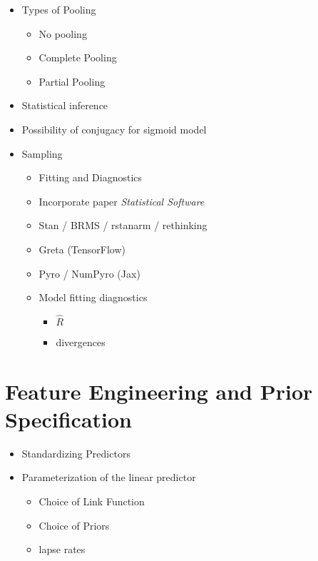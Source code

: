 \documentclass[
]{article}
\providecommand{\tightlist}{%
  \setlength{\itemsep}{0pt}\setlength{\parskip}{0pt}}
\begin{document}
\begin{itemize}
\tightlist
\item
  Types of Pooling

  \begin{itemize}
  \tightlist
  \item
    No pooling
  \item
    Complete Pooling
  \item
    Partial Pooling
  \end{itemize}
\item
  Statistical inference
\item
  Possibility of conjugacy for sigmoid model
\item
  Sampling

  \begin{itemize}
  \tightlist
  \item
    Fitting and Diagnostics
  \item
    Incorporate paper \emph{Statistical Software}
  \item
    Stan / BRMS / rstanarm / rethinking
  \item
    Greta (TensorFlow)
  \item
    Pyro / NumPyro (Jax)
  \item
    Model fitting diagnostics

    \begin{itemize}
    \tightlist
    \item
      \(\hat{R}\)
    \item
      divergences
    \end{itemize}
  \end{itemize}
\end{itemize}

\hypertarget{ch6}{%
\section{Feature Engineering and Prior Specification}\label{ch6}}

\begin{itemize}
\tightlist
\item
  Standardizing Predictors
\item
  Parameterization of the linear predictor

  \begin{itemize}
  \tightlist
  \item
    Choice of Link Function
  \item
    Choice of Priors
  \item
    lapse rates
  \end{itemize}
\end{itemize}
\end{document}
